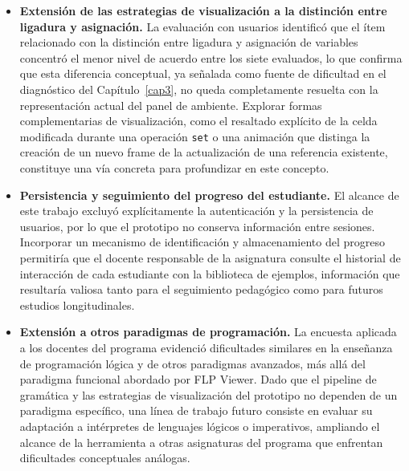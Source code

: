 \begin{itemize}
\item \textbf{Extensión de las estrategias de visualización a la distinción entre ligadura y asignación.} La evaluación con usuarios identificó que el ítem relacionado con la distinción entre ligadura y asignación de variables concentró el menor nivel de acuerdo entre los siete evaluados, lo que confirma que esta diferencia conceptual, ya señalada como fuente de dificultad en el diagnóstico del Capítulo~\ref{cap3}, no queda completamente resuelta con la representación actual del panel de ambiente. Explorar formas complementarias de visualización, como el resaltado explícito de la celda modificada durante una operación \texttt{set} o una animación que distinga la creación de un nuevo frame de la actualización de una referencia existente, constituye una vía concreta para profundizar en este concepto.

\item \textbf{Persistencia y seguimiento del progreso del estudiante.} El alcance de este trabajo excluyó explícitamente la autenticación y la persistencia de usuarios, por lo que el prototipo no conserva información entre sesiones. Incorporar un mecanismo de identificación y almacenamiento del progreso permitiría que el docente responsable de la asignatura consulte el historial de interacción de cada estudiante con la biblioteca de ejemplos, información que resultaría valiosa tanto para el seguimiento pedagógico como para futuros estudios longitudinales.

\item \textbf{Extensión a otros paradigmas de programación.} La encuesta aplicada a los docentes del programa evidenció dificultades similares en la enseñanza de programación lógica y de otros paradigmas avanzados, más allá del paradigma funcional abordado por FLP Viewer. Dado que el pipeline de gramática y las estrategias de visualización del prototipo no dependen de un paradigma específico, una línea de trabajo futuro consiste en evaluar su adaptación a intérpretes de lenguajes lógicos o imperativos, ampliando el alcance de la herramienta a otras asignaturas del programa que enfrentan dificultades conceptuales análogas.

\end{itemize}
